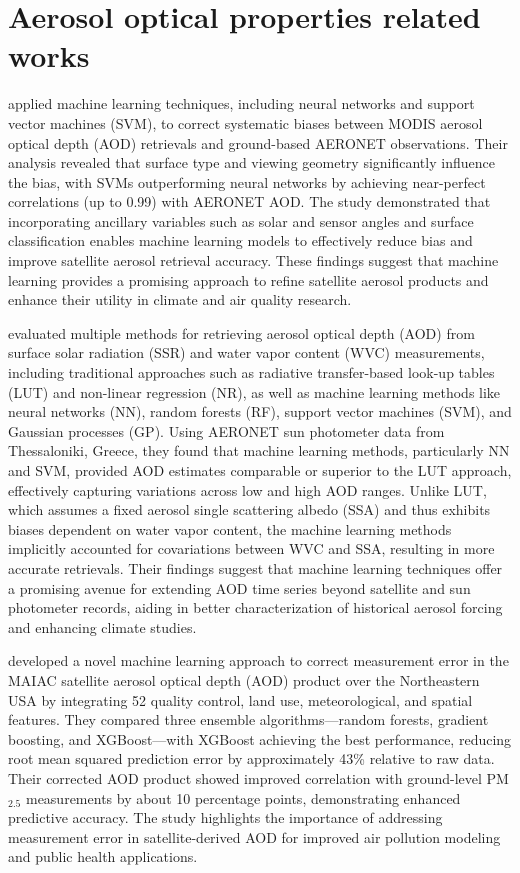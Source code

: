 \documentclass[11pt]{article}
\begin{document}
\section{Aerosol optical properties related works}
\citet{lary2009machine} applied machine learning techniques, including neural networks and support vector machines (SVM), to correct systematic biases between MODIS aerosol optical depth (AOD) retrievals and ground-based AERONET observations. Their analysis revealed that surface type and viewing geometry significantly influence the bias, with SVMs outperforming neural networks by achieving near-perfect correlations (up to 0.99) with AERONET AOD. The study demonstrated that incorporating ancillary variables such as solar and sensor angles and surface classification enables machine learning models to effectively reduce bias and improve satellite aerosol retrieval accuracy. These findings suggest that machine learning provides a promising approach to refine satellite aerosol products and enhance their utility in climate and air quality research.

\citet{huttunen2016retrieval} evaluated multiple methods for retrieving aerosol optical depth (AOD) from surface solar radiation (SSR) and water vapor content (WVC) measurements, including traditional approaches such as radiative transfer-based look-up tables (LUT) and non-linear regression (NR), as well as machine learning methods like neural networks (NN), random forests (RF), support vector machines (SVM), and Gaussian processes (GP). Using AERONET sun photometer data from Thessaloniki, Greece, they found that machine learning methods, particularly NN and SVM, provided AOD estimates comparable or superior to the LUT approach, effectively capturing variations across low and high AOD ranges. Unlike LUT, which assumes a fixed aerosol single scattering albedo (SSA) and thus exhibits biases dependent on water vapor content, the machine learning methods implicitly accounted for covariations between WVC and SSA, resulting in more accurate retrievals. Their findings suggest that machine learning techniques offer a promising avenue for extending AOD time series beyond satellite and sun photometer records, aiding in better characterization of historical aerosol forcing and enhancing climate studies.

\citet{just2018correcting} developed a novel machine learning approach to correct measurement error in the MAIAC satellite aerosol optical depth (AOD) product over the Northeastern USA by integrating 52 quality control, land use, meteorological, and spatial features. They compared three ensemble algorithms—random forests, gradient boosting, and XGBoost—with XGBoost achieving the best performance, reducing root mean squared prediction error by approximately 43\% relative to raw data. Their corrected AOD product showed improved correlation with ground-level PM$_{2.5}$ measurements by about 10 percentage points, demonstrating enhanced predictive accuracy. The study highlights the importance of addressing measurement error in satellite-derived AOD for improved air pollution modeling and public health applications.
\end{document}
